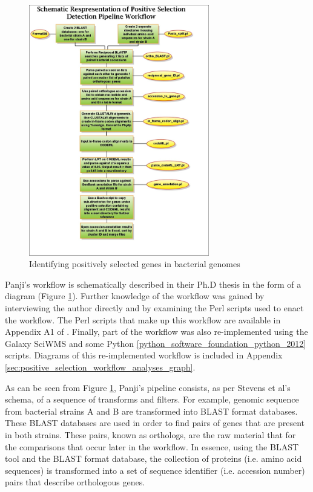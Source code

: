 \documentclass[a4paper,10pt]{scrreprt} \usepackage[utf8]{inputenc}
\begin{document}
\begin{figure}[!htb]
\centering
\includegraphics[width=0.7\textwidth]{sumir/Thesis_figures/Methods_section/pipeline_steps_mark_7}
\caption{Identifying positively selected genes in bacterial genomes}
\label{fig:sumir_pipeline}
\end{figure}

Panji's workflow is schematically described in their Ph.D thesis in the form of
a diagram (Figure \ref{fig:sumir_pipeline}). Further knowledge of the workflow
was gained by interviewing the author directly and by examining the Perl scripts
used to enact the workflow.  The Perl scripts that make up this workflow are
available in Appendix A1 of \cite{panji_identification_2009}. Finally, part of the workflow was also
re-implemented using the Galaxy \gls{SciWMS} and some Python \ref{python_software_foundation_python_2012} 
scripts. Diagrams of this re-implemented workflow is included in Appendix \ref{sec:positive_selection_workflow_analyses_graph}.

As can be seen from Figure \ref{fig:sumir_pipeline}, Panji's pipeline consists, as per Stevens et al's schema,
of a sequence of transforms and filters. For example, genomic sequence from bacterial strains A and B are 
transformed into BLAST format databases. These BLAST databases are used in order to find pairs of genes that
are present in both strains. These pairs, known as \glspl{ortholog}, are the raw material that for the comparisons that
occur later in the workflow. In essence, using the BLAST tool and the BLAST format database, the collection
of proteins (i.e. amino acid sequences) is transformed into a set of sequence identifier (i.e. accession number)
pairs that describe orthologous genes.
\end{document}
